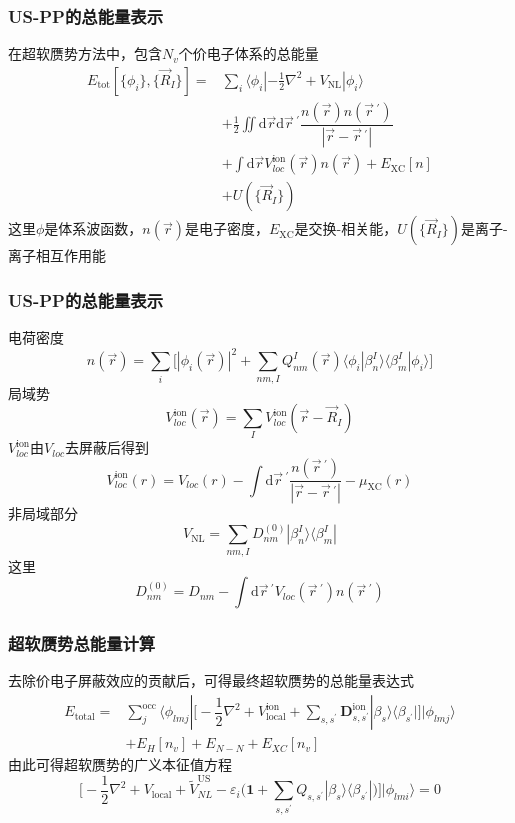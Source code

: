 {\frame
{
	\frametitle{\textrm{US-PP}的总能量表示}
	在超软赝势方法中，包含$N_v$个价电子体系的总能量
	\begin{displaymath}
		\begin{aligned}
			E_{\mathrm{tot}}[\{\phi_i\},\{\vec R_I\}]=&\sum_i\langle\phi_i|-\frac12\nabla^2+V_{\mathrm{NL}}|\phi_i\rangle\\
			&+\frac12\iint\mathrm{d}\vec r\mathrm{d}\vec r\,^{\prime}\dfrac{n(\vec r)n(\vec r\,^{\prime})}{|\vec r-\vec r\,^{\prime}|}\\
			&+\int\mathrm{d}\vec r V_{loc}^{\mathrm{ion}}(\vec r)n(\vec r)+E_{\mathrm{XC}}[n]\\
			&+U(\{\vec R_I\})
		\end{aligned}
	\end{displaymath}
	这里$\phi$是体系波函数，$n(\vec r)$是电子密度，$E_{\mathrm{XC}}$是交换-相关能，$U(\{\vec R_I\})$是离子-离子相互作用能
}

\frame
{
	\frametitle{\textrm{US-PP}的总能量表示}
	电荷密度$$n(\vec r)=\sum_i\big[|\phi_i(\vec r)|^2+\sum_{nm,I}Q_{nm}^I(\vec r)\langle\phi_i|\beta_n^I\rangle\langle\beta_m^I|\phi_i\rangle\big]$$
	局域势$$V_{loc}^{\mathrm{ion}}(\vec r)=\sum_IV_{loc}^{\mathrm{ion}}(\vec r-\vec R_I)$$
	$V_{loc}^{\mathrm{ion}}$由$V_{loc}$去屏蔽后得到$$V_{loc}^{\mathrm{ion}}(r)=V_{loc}(r)-\int\mathrm{d}\vec r\,^{\prime}\dfrac{n(\vec r\,^{\prime})}{|\vec r-\vec r\,^{\prime}|}-\mu_{\mathrm{XC}}(r)$$
	非局域部分$$V_{\mathrm{NL}}=\sum_{nm,I}D_{nm}^{(0)}|\beta_n^I\rangle\langle\beta_m^I|$$
	这里$$D_{nm}^{(0)}=D_{nm}-\int\mathrm{d}\vec r\,^{\prime}V_{loc}(\vec r\,^{\prime})n(\vec r\,^{\prime})$$
}

\frame
{
	\frametitle{超软赝势总能量计算}
	去除价电子屏蔽效应的贡献后，可得最终超软赝势的总能量表达式
	\begin{displaymath}
		\begin{aligned}
			E_{\mathrm{total}}=&\sum_j^{\mathrm{occ}}\langle\phi_{lmj}|\bigg[-\dfrac12\nabla^2+V_{\mathrm{local}}^{\mathrm{ion}}+\sum_{s,s^{\prime}}\mathbf{D}_{s,s^{\prime}}^{\mathrm{ion}}|\beta_s\rangle\langle\beta_{s^{\prime}}|\bigg]|\phi_{lmj}\rangle\\
			&+E_{H}[n_v]+E_{N-N}+E_{XC}[n_v]
		\end{aligned}
	\end{displaymath}
	{\fontsize{7.2pt}{5.2pt}}
	由此可得超软赝势的广义本征值方程
	$$\bigg[-\dfrac12\nabla^2+V_{\mathrm{local}}+\tilde V_{NL}^{\mathrm{US}}-\varepsilon_i\bigg(\mathbf{1}+\sum_{s,s^{\prime}}Q_{s,s^{\prime}}|\beta_s\rangle\langle\beta_{s^{\prime}}|\bigg)\bigg]|\phi_{lmi}\rangle=0$$
}

}
